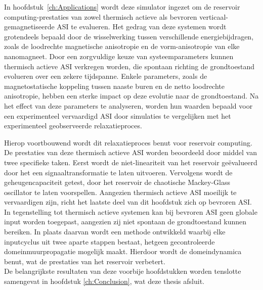 In hoofdstuk~\ref{ch:Applications} wordt deze \hotspice simulator ingezet om de reservoir computing-prestaties van zowel thermisch actieve als bevroren verticaal-gemagnetiseerde ASI te evalueren.
Het gedrag van deze systemen wordt grotendeels bepaald door de wisselwerking tussen verschillende energiebijdragen, zoals de loodrechte magnetische anisotropie en de vorm-anisotropie van elke nanomagneet.
Door een zorgvuldige keuze van systeemparameters kunnen thermisch actieve ASI verkregen worden, die spontaan richting de grondtoestand evolueren over een zekere tijdspanne.
Enkele parameters, zoals de magnetostatische koppeling tussen naaste buren en de netto loodrechte anisotropie, hebben een sterke impact op deze evolutie naar de grondtoestand.
Na het effect van deze parameters te analyseren, worden hun waarden bepaald voor een experimenteel vervaardigd ASI door simulaties te vergelijken met het experimenteel geobserveerde relaxatieproces. \par
Hierop voortbouwend wordt dit relaxatieproces benut voor reservoir computing.
De prestaties van deze thermisch actieve ASI worden beoordeeld door middel van twee specifieke taken.
Eerst wordt de niet-lineariteit van het reservoir ge\"evalueerd door het een signaaltransformatie te laten uitvoeren.
Vervolgens wordt de geheugencapaciteit getest, door het reservoir de chaotische Mackey-Glass oscillator te laten voorspellen.
Aangezien thermisch actieve ASI moeilijk te vervaardigen zijn, richt het laatste deel van dit hoofdstuk zich op bevroren ASI.
In tegenstelling tot thermisch actieve systemen kan bij bevroren ASI geen globale input worden toegepast, aangezien zij niet spontaan de grondtoestand kunnen bereiken.
In plaats daarvan wordt een methode ontwikkeld waarbij elke inputcyclus uit twee aparte stappen bestaat, hetgeen gecontroleerde domeinmuurpropagatie mogelijk maakt.
Hierdoor wordt de domeindynamica benut, wat de prestaties van het reservoir verbetert. \\

De belangrijkste resultaten van deze voorbije hoofdstukken worden tenslotte samengevat in hoofdstuk \ref{ch:Conclusion}, wat deze thesis afsluit.
